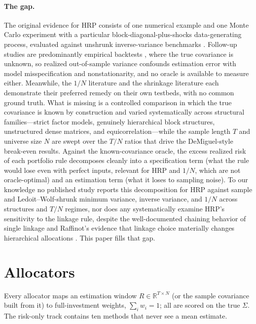 \documentclass[11pt]{article}
\newcommand{\Sig}{\Sigma}
\newcommand{\TN}{T/N}
\begin{document}
\paragraph{The gap.}
The original evidence for HRP consists of one numerical example and one Monte
Carlo experiment with a particular block-diagonal-plus-shocks data-generating
process, evaluated against unshrunk inverse-variance benchmarks
\citep{lopezdeprado2016building}. Follow-up studies are predominantly
empirical backtests
\citep{raffinot2017hierarchical,lohre2020hierarchical,jaeger2021interpretable},
where the true covariance is unknown, so realized out-of-sample variance
confounds estimation error with model misspecification and nonstationarity,
and no oracle is available to measure either. Meanwhile, the $1/N$ literature
\citep{demiguel2009optimal} and the shrinkage literature
\citep{ledoit2004honey,ledoit2004well} each demonstrate their preferred
remedy on their own testbeds, with no common ground truth. What is missing is
a controlled comparison in which the true covariance is known by construction
and varied systematically across structural families---strict factor models,
genuinely hierarchical block structures, unstructured dense matrices, and
equicorrelation---while the sample length $T$ and universe size $N$ are swept
over the $\TN$ ratios that drive the DeMiguel-style break-even results.
Against the known-covariance oracle, the excess realized risk of each
portfolio rule decomposes cleanly into a specification term (what the rule
would lose even with perfect inputs, relevant for HRP and $1/N$, which are
not oracle-optimal) and an estimation term (what it loses to sampling noise).
To our knowledge no published study reports this decomposition for HRP
against sample and Ledoit--Wolf-shrunk minimum variance, inverse variance,
and $1/N$ across structures and $\TN$ regimes, nor does any systematically
examine HRP's sensitivity to the linkage rule, despite the well-documented
chaining behavior of single linkage \citep{murtagh2012algorithms} and
Raffinot's evidence that linkage choice materially changes hierarchical
allocations \citep{raffinot2017hierarchical}. This paper fills that gap.

\section{Allocators}
\label{sec:allocators}

Every allocator maps an estimation window
$R\in\mathbb{R}^{T\times N}$ (or the sample covariance built from it) to
full-investment weights, $\sum_i w_i = 1$; all are scored on the true
$\Sig$. The risk-only track contains ten methods that never see a mean
estimate.
\end{document}
